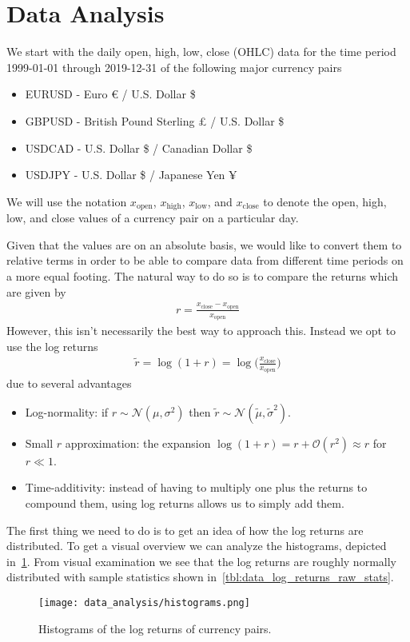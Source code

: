 \section{Data Analysis}
We start with the daily open, high, low, close (OHLC) data for the time period 1999-01-01 through 2019-12-31 of the following major currency pairs
\begin{itemize}
    \item EURUSD - Euro € / U.S. Dollar \$
    \item GBPUSD - British Pound Sterling £ / U.S. Dollar \$
    \item USDCAD - U.S. Dollar \$ / Canadian Dollar \$
    \item USDJPY - U.S. Dollar \$ / Japanese Yen ¥
\end{itemize}
We will use the notation \( x_\text{open} \), \( x_\text{high} \), \( x_\text{low} \), and \( x_\text{close} \) to denote the open, high, low, and close values of a currency pair on a particular day.

Given that the values are on an absolute basis, we would like to convert them to relative terms in order to be able to compare data from different time periods on a more equal footing.
The natural way to do so is to compare the returns which are given by
\begin{align}
    r = \frac{x_\text{close} - x_\text{open}}{x_\text{open}}
\end{align}
However, this isn't necessarily the best way to approach this.
Instead we opt to use the log returns
\begin{align}
    \tilde{r}
        = \log(1+r)
        = \log\bigg( \frac{x_\text{close}}{x_\text{open}} \bigg)
\end{align}
due to several advantages~\cite{quantivity_2012}
\begin{itemize}
    \item Log-normality: if \( r \sim \mathcal{N}(\mu, \sigma^2) \) then \( \tilde{r} \sim \mathcal{N}(\tilde{\mu}, \tilde{\sigma}^2) \).
    \item Small \( r \) approximation: the expansion \( \log (1 + r) = r + \mathcal{O}(r^2) \approx r \) for \( r \ll 1 \).
    \item Time-additivity: instead of having to multiply one plus the returns to compound them, using log returns allows us to simply add them.
\end{itemize}

The first thing we need to do is to get an idea of how the log returns are distributed.
To get a visual overview we can analyze the histograms, depicted in~\cref{fig:histograms_raw}.
From visual examination we see that the log returns are roughly normally distributed with sample statistics shown in~\cref{tbl:data_log_returns_raw_stats}.
\begin{figure}[!htb]
    \begin{center}
        \texttt{[image: data\_analysis/histograms.png]}
    \end{center}
    \caption{Histograms of the log returns of currency pairs.}
    \label{fig:histograms_raw}
\end{figure}

